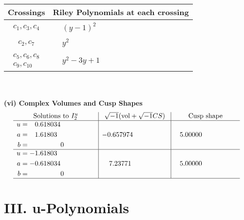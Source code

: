 \documentclass[1p]{elsarticle_modified}
\theoremstyle{definition}
\newcommand{\I}{\sqrt{-1}}
\begin{document}
\begin{tabular}{m{50pt}|m{274pt}}
Crossings & \hspace{64pt}Riley Polynomials at each crossing \\
\hline $$\begin{aligned}c_{1},c_{3},c_{4}\end{aligned}$$&$\begin{aligned}
&(y-1)^2
\end{aligned}$\\
\hline $$\begin{aligned}c_{2},c_{7}\end{aligned}$$&$\begin{aligned}
&y^2
\end{aligned}$\\
\hline $$\begin{aligned}c_{5},c_{6},c_{8}\\c_{9},c_{10}\end{aligned}$$&$\begin{aligned}
&y^2-3 y+1
\end{aligned}$\\
\hline
\end{tabular}\\~\\
\newpage\flushleft \textbf{(vi) Complex Volumes and Cusp Shapes}
$$\begin{array}{c|c|c}  
\text{Solutions to }I^u_{2}& \I (\text{vol} + \sqrt{-1}CS) & \text{Cusp shape}\\
 \hline 
\begin{aligned}
u &= \phantom{-}0.618034\phantom{ +0.000000I} \\
a &= \phantom{-}1.61803\phantom{ +0.000000I} \\
b &= \phantom{-0.000000 } 0\end{aligned}
 & -0.657974\phantom{ +0.000000I} & \phantom{-}5.00000\phantom{ +0.000000I} \\ \hline\begin{aligned}
u &= -1.61803\phantom{ +0.000000I} \\
a &= -0.618034\phantom{ +0.000000I} \\
b &= \phantom{-0.000000 } 0\end{aligned}
 & \phantom{-}7.23771\phantom{ +0.000000I} & \phantom{-}5.00000\phantom{ +0.000000I}\\
 \hline 
 \end{array}$$\newpage
\newpage\renewcommand{\arraystretch}{1}
\centering \section*{ III. u-Polynomials}
\end{document}
